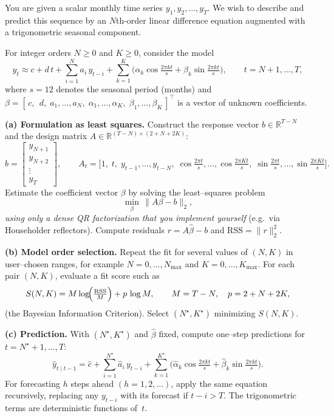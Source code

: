 \begin{problem}
You are given a scalar monthly time series $y_1, y_2, \dots, y_T$.
We wish to describe and predict this sequence by an $N$th-order
linear difference equation augmented with a trigonometric seasonal component.

\medskip
For integer orders $N \ge 0$ and $K \ge 0$, consider the model
\[
y_t \approx
c + d\,t
+ \sum_{i=1}^{N} a_i\,y_{t-i}
+ \sum_{k=1}^{K} \!\Big(
  \alpha_k \cos\!\tfrac{2\pi k t}{s}
  + \beta_k \sin\!\tfrac{2\pi k t}{s}
\Big),
\qquad t = N+1, \dots, T,
\]
where $s=12$ denotes the seasonal period (months) and
$\beta = [\,c,\;\,d,\;a_1,\dots,a_N,\;\alpha_1,\dots,\alpha_K,\;\beta_1,\dots,\beta_K\,]^\top$
is a vector of unknown coefficients.

\medskip
\textbf{(a) Formulation as least squares.}
Construct the response vector $b\in\mathbb{R}^{T-N}$ and the design matrix
$A\in\mathbb{R}^{(T-N)\times(2+N+2K)}$:
\[
b =
\begin{bmatrix}
y_{N+1}\\
y_{N+2}\\
\vdots\\
y_T
\end{bmatrix},
\qquad
A_t =
\big[
1,\;
t,\;
y_{t-1},\dots,y_{t-N},\;
\cos\tfrac{2\pi t}{s},\dots,\cos\tfrac{2\pi K t}{s},\;
\sin\tfrac{2\pi t}{s},\dots,\sin\tfrac{2\pi K t}{s}
\big].
\]
Estimate the coefficient vector $\beta$ by solving the least--squares problem
\[
\min_{\beta}\,\|A\beta - b\|_2,
\]
\emph{using only a dense QR factorization that you implement yourself}
(e.g.\ via Householder reflectors).
Compute residuals $r=A\hat\beta - b$ and
$\mathrm{RSS} = \|r\|_2^2$.

\medskip
\textbf{(b) Model order selection.}
Repeat the fit for several values of $(N,K)$ in user--chosen ranges,
for example $N=0,\dots,N_{\max}$ and $K=0,\dots,K_{\max}$.
For each pair $(N,K)$, evaluate a fit score such as
\[
S(N,K) =
M\log\!\Bigl(\tfrac{\mathrm{RSS}}{M}\Bigr)
+ p\,\log M,
\qquad
M=T-N,\quad
p = 2 + N + 2K,
\]
(the Bayesian Information Criterion).
Select $(N^\star,K^\star)$ minimizing $S(N,K)$.

\medskip
\textbf{(c) Prediction.}
With $(N^\star,K^\star)$ and $\hat\beta$ fixed,
compute one--step predictions for
$t=N^\star+1,\dots,T$:
\[
\widehat y_{t\mid t-1}
= \hat c
  + \sum_{i=1}^{N^\star}\hat a_i\,y_{t-i}
  + \sum_{k=1}^{K^\star}
      \big(
        \hat\alpha_k \cos\tfrac{2\pi k t}{s}
        + \hat\beta_k \sin\tfrac{2\pi k t}{s}
      \big).
\]
For forecasting $h$ steps ahead $(h=1,2,\dots)$, apply the same equation recursively,
replacing any $y_{t-i}$ with its forecast if $t-i>T$.
The trigonometric terms are deterministic functions of~$t$.


\end{problem}
